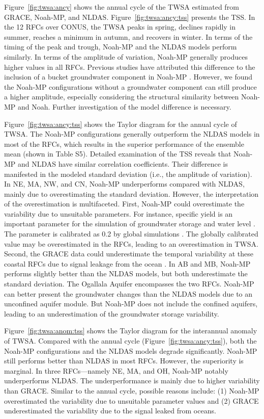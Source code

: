 \documentclass[essd, manuscript]{copernicus}
\begin{document}
Figure~\ref{fig:twsa:ancy} shows the annual cycle of the TWSA estimated from GRACE, Noah-MP, and NLDAS\@. Figure~\ref{fig:twsa:ancy:tss} presents the TSS\@. In the 12 RFCs over CONUS, the TWSA peaks in spring, declines rapidly in summer, reaches a minimum in autumn, and recovers in winter. In terms of the timing of the peak and trough, Noah-MP and the NLDAS models perform similarly. In terms of the amplitude of variation, Noah-MP generally produces higher values in all RFCs. Previous studies have attributed this difference to the inclusion of a bucket groundwater component in Noah-MP \citep{cai2014JGRAa, ma2017JGRA}. However, we found the Noah-MP configurations without a groundwater component can still produce a higher amplitude, especially considering the structural similarity between Noah-MP and Noah. Further investigation of the model difference is necessary.

Figure~\ref{fig:twsa:ancy:tss} shows the Taylor diagram for the annual cycle of TWSA\@. The Noah-MP configurations generally outperform the NLDAS models in most of the RFCs, which results in the superior performance of the ensemble mean (shown in Table S5). Detailed examination of the TSS reveals that Noah-MP and NLDAS have similar correlation coefficients. Their difference is manifested in the modeled standard deviation (i.e., the amplitude of variation). In NE, MA, NW, and CN, Noah-MP underperforms compared with NLDAS, mainly due to overestimating the standard deviation. However, the interpretation of the overestimation is multifaceted. First, Noah-MP could overestimate the variability due to unsuitable parameters. For instance, specific yield is an important parameter for the simulation of groundwater storage and water level \citep{lv2021JAMES}. The parameter is calibrated as 0.2 by global simulations \citep{niu2007JGRa}. The globally calibrated value may be overestimated in the RFCs, leading to an overestimation in TWSA\@. Second, the GRACE data could underestimate the temporal variability at these coastal RFCs due to signal leakage from the ocean \citep{cai2014JGRAa}. In AB and MB, Noah-MP performs slightly better than the NLDAS models, but both underestimate the standard deviation. The Ogallala Aquifer encompasses the two RFCs. Noah-MP can better present the groundwater changes than the NLDAS models due to an unconfined aquifer module. But Noah-MP does not include the confined aquifers, leading to an underestimation of the groundwater storage variability.

Figure~\ref{fig:twsa:anom:tss} shows the Taylor diagram for the interannual anomaly of TWSA\@. Compared with the annual cycle (Figure~\ref{fig:twsa:ancy:tss}), both the Noah-MP configurations and the NLDAS models degrade significantly. Noah-MP still performs better than NLDAS in most RFCs. However, the superiority is marginal. In three RFCs---namely NE, MA, and OH, Noah-MP notably underperforms NLDAS\@. The underperformance is mainly due to higher variability than GRACE\@. Similar to the annual cycle, possible reasons include: (1) Noah-MP overestimated the variability due to unsuitable parameter values and (2) GRACE underestimated the variability due to the signal leaked from oceans.
\end{document}

